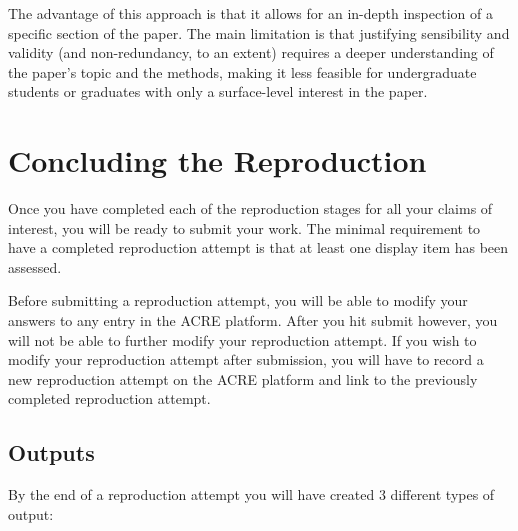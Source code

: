 \documentclass[]{book}
\begin{document}
The advantage of this approach is that it allows for an in-depth inspection of a specific section of the paper. The main limitation is that justifying sensibility and validity (and non-redundancy, to an extent) requires a deeper understanding of the paper's topic and the methods, making it less feasible for undergraduate students or graduates with only a surface-level interest in the paper.

\hypertarget{concluding-the-reproduction}{%
\chapter{Concluding the Reproduction}\label{concluding-the-reproduction}}

Once you have completed each of the reproduction stages for all your claims of interest, you will be ready to submit your work. The minimal requirement to have a completed reproduction attempt is that at least one display item has been assessed.

Before submitting a reproduction attempt, you will be able to modify your answers to any entry in the ACRE platform. After you hit submit however, you will not be able to further modify your reproduction attempt. If you wish to modify your reproduction attempt after submission, you will have to record a new reproduction attempt on the ACRE platform and link to the previously completed reproduction attempt.

\hypertarget{outputs}{%
\section{Outputs}\label{outputs}}

By the end of a reproduction attempt you will have created 3 different types of output:
\end{document}
